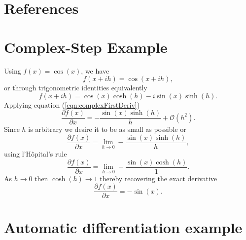 \documentclass[preprint,12pt]{elsarticle}
\begin{document}

\section{References}




\appendix
\renewcommand*{\thesection}{\Alph{section}}
%
\section{Complex-Step Example}
\label{sec:appendixA}
%
Using $f(x) = \cos(x)$, we have
%
\[
f (x + i h) = \cos(x + i h),
\]
%
or through trigonometric identities equivalently
%
\[
f(x + i h) = \cos(x) \cosh(h) - i \sin(x) \sinh(h).
\]
%
Applying equation (\ref{eqn:complexFirstDeriv})
\[
    \frac{\partial f(x)}{\partial x} = - \frac{\sin(x) \sinh(h)}{h} + \mathcal{O}(h^2).
\]
Since $h$ is arbitrary we desire it to be as small as possible or
\[
\frac{\partial f(x)}{\partial x} = \lim_{h \to 0} - \frac{\sin(x) \sinh(h)}{h},
\]
using l'H\^opital's rule
\[
\frac{\partial f(x)}{\partial x} = \lim_{h \to 0} - \frac{\sin(x) \cosh(h)}{1}.
\]
As $h \to 0$ then $\cosh(h) \to 1$ thereby recovering the exact derivative
\[
\frac{\partial f(x)}{\partial x} =-\sin(x).
\]

\section{Automatic differentiation example}
\label{sec:appendixB}
\end{document}
